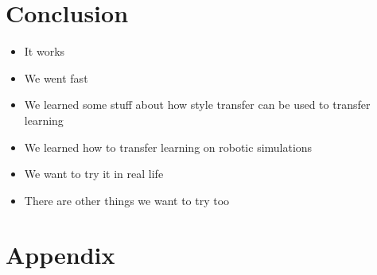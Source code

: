 \documentclass[paper=a4, fontsize=11pt]{scrartcl} %
\begin{document}
\section{Conclusion}

\begin{itemize}
	\item It works
	\item We went fast
	\item We learned some stuff about how style transfer can be used to transfer learning
	\item We learned how to transfer learning on robotic simulations
	\item We want to try it in real life
	\item There are other things we want to try too
\end{itemize}


\section{Appendix}




\end{document}
